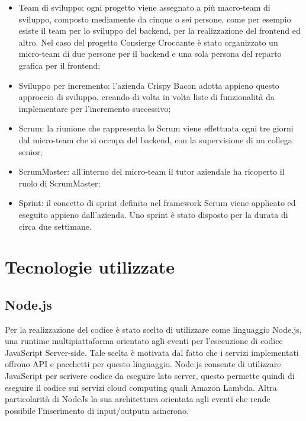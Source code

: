 \begin{itemize}
    \item Team di sviluppo: ogni progetto viene assegnato a più macro-team di sviluppo, composto mediamente da cinque o sei persone, come per esempio esiste il team per lo sviluppo del backend, per la realizzazione del frontend ed altro. Nel caso del progetto Consierge Croccante è stato organizzato un micro-team di due persone per il backend e una sola persona del reparto grafica per il frontend;
    
    \item Sviluppo per incremento: l’azienda Crispy Bacon adotta appieno questo approccio di sviluppo, creando di volta in volta liste di funzionalità da implementare per l'incremento successivo;
    
    \item Scrum: la riunione che rappresenta lo Scrum viene effettuata ogni tre giorni dal micro-team che si occupa del backend, con la supervisione di un collega senior;
    
    \item ScrumMaster: all'interno del micro-team il tutor aziendale ha ricoperto il ruolo di ScrumMaster;
    
    \item Sprint: il concetto di sprint definito nel framework Scrum viene applicato ed eseguito appieno dall'azienda. Uno sprint è stato disposto per la durata di circa due settimane.
\end{itemize}

\section{Tecnologie utilizzate}
\subsection{Node.js}
\label{nodejs}
Per la realizzazione del codice è stato scelto di utilizzare come linguaggio Node.js, una runtime multipiattaforma orientato agli eventi per l'esecuzione di codice JavaScript Server-side. Tale scelta è motivata dal fatto che i servizi implementati offrono API e pacchetti per questo linguaggio. Node.js consente di utilizzare JavaScript per scrivere codice da eseguire lato server, questo permette quindi di eseguire il codice sui servizi cloud computing quali Amazon Lambda. Altra particolarità di NodeJs la sua architettura orientata agli eventi che rende possibile l’inserimento di input/outputn asincrono. 

